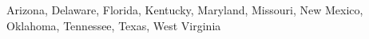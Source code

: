 Arizona, Delaware, Florida, Kentucky, Maryland, Missouri, New Mexico, Oklahoma, Tennessee, Texas, West Virginia